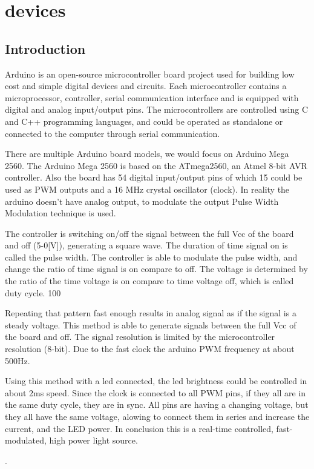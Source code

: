 \documentclass[\main/master.tex]{subfiles}
\begin{document}
\chapter{devices}\label{chp:example-1}
\doublespacing

\section{Introduction}
Arduino is an open-source microcontroller board project used for building low cost and simple digital devices and circuits. Each microcontroller contains a microprocessor, controller, serial communication interface and is equipped with digital and analog input/output pins. The microcontrollers are controlled using C and C++ programming languages, and could be operated as standalone or connected to the computer through serial communication. 
\par
There are multiple Arduino board models, we would focus on Arduino Mega 2560. The Arduino Mega 2560 is based on the ATmega2560, an Atmel 8-bit AVR controller. Also the board has 54 digital input/output pins of which 15 could be used as PWM outputs and a 16 MHz crystal oscillator (clock). In reality the arduino doesn't have analog output, to modulate the output Pulse Width Modulation technique is used.
\par
The controller is switching on/off the signal between the full Vcc of the board and off (5-0[V]), generating a square wave. The duration of time signal on is called the pulse width. The controller is able to modulate the pulse width, and change the ratio of time signal is on compare to off. The voltage is determined by the ratio of the time voltage is on compare to time voltage off, which is called duty cycle. 100%
\par
Repeating that pattern fast enough results in analog signal as if the signal is a steady voltage. This method is able to generate signals between the full Vcc of the board and off. The signal resolution is limited by the microcontroller resolution (8-bit). Due to the fast clock the arduino PWM frequency at about 500Hz.
\par
Using this method with a led connected, the led brightness could be controlled in about 2ms speed. Since the clock is connected to all PWM pins, if they all are in the same duty cycle, they are in sync. All pins are having a changing voltage, but they all have the same voltage, alowing to connect them in series and increase the current, and the LED power. In conclusion this is a real-time controlled, fast-modulated, high power light source. 


\color{blue}
\par

 .
\end{document}
